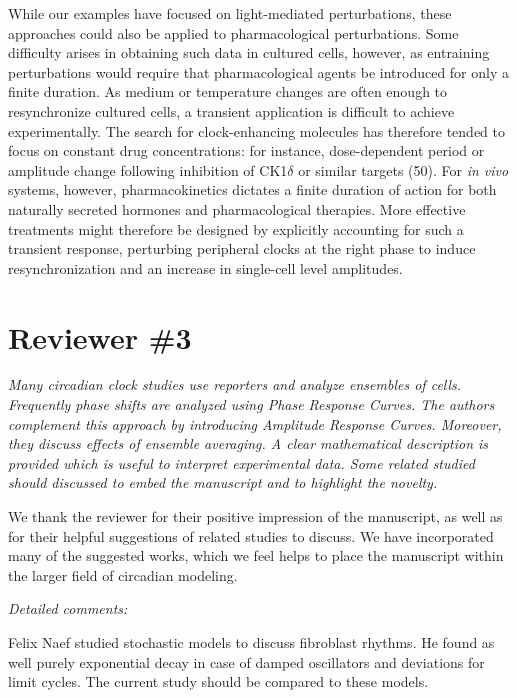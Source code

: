 \documentclass[11pt, letterpaper]{article}
\newenvironment{reviewer}{\itshape\color{gray}}{}
\newenvironment{manuscript}[1]{\begin{center}\begin{tcolorbox}[colback=green!5!white,colframe=green!75!black,width=0.8\textwidth,title={#1},breakable,fonttitle=\bfseries]}{\end{tcolorbox}\end{center}}
\begin{document}
\begin{manuscript}{Page 18}
While our examples have focused on light-mediated perturbations, these approaches could also be applied to pharmacological perturbations.
Some difficulty arises in obtaining such data in cultured cells, however, as entraining perturbations would require that pharmacological agents be introduced for only a finite duration.
As medium or temperature changes are often enough to resynchronize cultured cells, a transient application is difficult to achieve experimentally.
The search for clock-enhancing molecules has therefore tended to focus on constant drug concentrations: for instance, dose-dependent period or amplitude change following inhibition of CK1$\delta$ or similar targets (50).
For {\itshape in vivo} systems, however, pharmacokinetics dictates a finite duration of action for both naturally secreted hormones and pharmacological therapies.
More effective treatments might therefore be designed by explicitly accounting for such a transient response, perturbing peripheral clocks at the right phase to induce resynchronization and an increase in single-cell level amplitudes.
\end{manuscript}

\section*{Reviewer \#3}

\begin{reviewer}
Many circadian clock studies use reporters and analyze ensembles of cells.
Frequently phase shifts are analyzed using Phase Response Curves.
The authors complement this approach by introducing Amplitude Response Curves.
Moreover, they discuss effects of ensemble averaging.
A clear mathematical description is provided which is useful to interpret experimental data.
Some related studied should discussed to embed the manuscript and to highlight the novelty.

\end{reviewer}
 
We thank the reviewer for their positive impression of the manuscript, as well as for their helpful suggestions of related studies to discuss. We have incorporated many of the suggested works, which we feel helps to place the manuscript within the larger field of circadian modeling.

\begin{reviewer}
Detailed comments: 
 
Felix Naef studied stochastic models to discuss fibroblast rhythms.
He found as well purely exponential decay in case of damped oscillators and deviations for limit cycles.
The current study should be compared to these models.
\end{reviewer}
 
\end{document}
